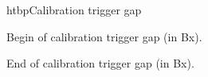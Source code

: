 \begin{register}{htbp}{Calibration trigger gap}{}
	\label{calibration_trigger_gap_reg}%
	\regnewline%

	\begin{regdesc}
	\begin{reglist}
		\item [begin\_calibration\_trigger\_gap] Begin of calibration trigger gap (in Bx).
		\item [end\_calibration\_trigger\_gap] End of calibration trigger gap (in Bx).
	\end{reglist}
	\end{regdesc}
\end{register}

\clearpage

